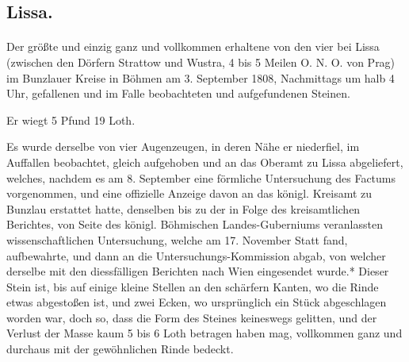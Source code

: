\documentclass[a4paper, 11pt, oneside, german]{article}
\begin{document}
\subsection{Lissa.}
\paragraph{}
Der größte und einzig ganz und vollkommen erhaltene von den vier bei Lissa (zwischen den Dörfern Strattow und Wustra, 4 bis 5 Meilen O. N. O. von Prag) im Bunzlauer Kreise in Böhmen am 3. September 1808, Nachmittags um halb 4 Uhr, gefallenen und im Falle beobachteten und aufgefundenen Steinen.

Er wiegt 5 Pfund 19 Loth.

Es wurde derselbe von vier Augenzeugen, in deren Nähe er niederfiel, im Auffallen beobachtet, gleich aufgehoben und an das Oberamt zu Lissa abgeliefert, welches, nachdem es am 8. September eine förmliche Untersuchung des Factums vorgenommen, und eine offizielle Anzeige davon an das königl. Kreisamt zu Bunzlau erstattet hatte, denselben bis zu der in Folge des kreisamtlichen Berichtes, von Seite des königl. Böhmischen Landes-Guberniums veranlassten wissenschaftlichen Untersuchung, welche am 17. November Statt fand, aufbewahrte, und dann an die Untersuchungs-Kommission abgab, von welcher derselbe mit den diessfälligen Berichten nach Wien eingesendet wurde.* Dieser Stein ist, bis auf einige kleine Stellen an den schärfern Kanten, wo die Rinde etwas abgestoßen ist, und zwei Ecken, wo ursprünglich ein Stück abgeschlagen worden war, doch so, dass die Form des Steines keineswegs gelitten, und der Verlust der Masse kaum 5 bis 6 Loth betragen haben mag, vollkommen ganz und durchaus mit der gewöhnlichen Rinde bedeckt.
\end{document}
